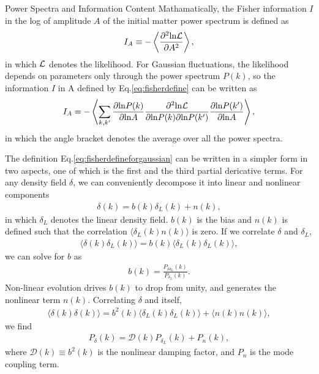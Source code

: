 \begin{section}{Power Spectra and Information Content}
   Mathamatically, the Fisher information \cite{bib:Tegmark1997} $I$ in the log of amplitude $A$ of the initial 
matter power spectrum is defined as 
\begin{align}
   I_A \equiv -\left\langle \frac{\partial ^2 \mathrm{ln \mathcal{L}}}{\partial A ^2}\right\rangle,
\label{eq:fisherdefine}
\end{align}
   in which $\mathcal{L}$ denotes the likelihood. For Gaussian fluctuations, the likelihood depends on
parameters only through the power spectrum $P(k)$, so the information $I$ in A defined by Eq.\ref{eq:fisherdefine}
can be written as \cite{bib:Rimes2006}
\begin{align}
    I_A = - \left\langle \sum_{k,k'} \frac{\partial \mathrm{ln} P(k)}{\partial \mathrm{ln} A} 
\frac{\partial ^2 \mathrm{ln \mathcal{L}}}{\partial \mathrm{ln} P(k) \partial \mathrm{ln} P(k')}
\frac{\partial \mathrm{ln} P(k')}{\partial \mathrm{ln} A}\right\rangle,
\label{eq:fisherdefineforgaussian}
\end{align}
in which the angle bracket denotes the average over all the power spectra.

  The definition Eq.\ref{eq:fisherdefineforgaussian} can be written in a simpler form in two aspects, one 
of which is the first and the third partial dericative terms. 
For any density field $\delta$, we can conveniently decompose it into linear and nonlinear components
\begin{align}
    \delta (k) = b (k) \delta _L (k) + n (k),
\label{eq:decompose}
\end{align}
in which $\delta_L$ denotes the linear density field. $b (k)$ is the bias and $n (k)$ is defined  
such that the correlation $\langle \delta_L (k) n (k) \rangle$ is zero. If we correlate  
$\delta$ and $\delta_L$,
\begin{align}
   \langle \delta (k) \delta_L (k) \rangle = b (k) \langle \delta_L (k) \delta_L (k) \rangle,
\label{eq:correlating}
\end{align} 
    we can solve for $b$ as 
\begin{align}
    b (k) = \frac{P _{\delta \delta_L}(k)}{P_{\delta_L}(k)}.
\label{eq:bofk}
\end{align}
Non-linear evolution drives $b (k)$ to drop from unity, and generates the nonlinear term $n (k)$. 
Correlating $\delta$ and itself, 
\begin{align}
  \langle \delta (k) \delta (k) \rangle = b^2 (k) \langle \delta_L (k) \delta_L (k) \rangle + \langle n(k)n(k) \rangle,
\end{align}
we find 
\begin{align}
   P_\delta (k) = \mathcal{D} (k) P_{\delta_L} (k) + P_n (k),
\label{eq:powerdecompose}
\end{align}
where $\mathcal{D}(k) \equiv b^2 (k)$ is the nonlinear damping factor, and $P_n$ is the mode coupling term.


\end{section}
